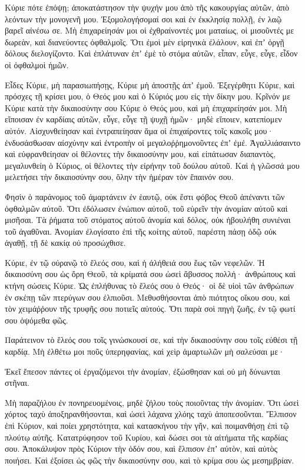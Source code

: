 \begin{spacing}{1.1}
\begin{multicols}{2}
Κύριε πότε ἐπόψῃ; ἀποκατάστησον τὴν ψυχήν μου ἀπὸ τῆς κακουργίας αὐτῶν, ἀπὸ λεόντων τὴν μονογενῆ μου.
Ἐξομολογήσομαί σοι καὶ ἐν ἐκκλησίᾳ πολλῇ, ἐν λαῷ βαρεῖ αἰνέσω σε.
Μὴ ἐπιχαρείησάν μοι οἱ ἐχθραίνοντές μοι ματαίως, οἱ μισοῦντές με δωρεὰν, καὶ διανεύοντες ὀφθαλμοῖς.
Ὅτι ἐμοὶ μὲν εἰρηνικὰ ἐλάλουν, καὶ ἐπʼ ὀργῇ δόλους διελογίζοντο.
Καὶ ἐπλάτυναν ἐπʼ ἐμὲ τὸ στόμα αὐτῶν, εἶπαν, εὖγε, εὖγε, εἶδον οἱ ὀφθαλμοὶ ἡμῶν.

Εἶδες Κύριε, μὴ παρασιωπήσῃς, Κύριε μὴ ἀποστῇς ἀπʼ ἐμοῦ.
Ἐξεγέρθητι Κύριε, καὶ πρόσχες τῇ κρίσει μου, ὁ Θεός μου καὶ ὁ Κύριός μου εἰς τὴν δίκην μου.
Κρῖνόν με Κύριε κατὰ τὴν δικαιοσύνην σου Κύριε ὁ Θεός μου, καὶ μὴ ἐπιχαρείησάν μοι.
Μὴ εἴποισαν ἐν καρδίαις αὐτῶν, εὖγε, εὖγε τῇ ψυχῇ ἡμῶν· μηδὲ εἴποιεν, κατεπίομεν αὐτόν.
Αἰσχυνθείησαν καὶ ἐντραπείησαν ἅμα οἱ ἐπιχαίροντες τοῖς κακοῖς μου· ἐνδυσάσθωσαν αἰσχύνην καὶ ἐντροπὴν οἱ μεγαλοῤῥημονοῦντες ἐπʼ ἐμέ.
Ἀγαλλιάσαιντο καὶ εὐφρανθείησαν οἱ θέλοντες τὴν δικαιοσύνην μου, καὶ εἰπάτωσαν διαπαντὸς, μεγαλυνθείη ὁ Κύριος, οἱ θέλοντες τὴν εἰρήνην τοῦ δούλου αὐτοῦ.
Καὶ ἡ γλῶσσά μου μελετήσει τὴν δικαιοσύνην σου, ὅλην τὴν ἡμέραν τὸν ἔπαινόν σου.

Φησὶν ὁ παράνομος τοῦ ἁμαρτάνειν ἐν ἑαυτῷ, οὐκ ἔστι φόβος Θεοῦ ἀπέναντι τῶν ὀφθαλμῶν αὐτοῦ.
Ὅτι ἐδόλωσεν ἐνώπιον αὐτοῦ, τοῦ εὑρεῖν τὴν ἀνομίαν αὐτοῦ καὶ μισῆσαι.
Τὰ ῥήματα τοῦ στόματος αὐτοῦ ἀνομία καὶ δόλος, οὐκ ἠβουλήθη συνιέναι τοῦ ἀγαθῦναι.
Ἀνομίαν ἐλογίσατο ἐπὶ τῆς κοίτης αὐτοῦ, παρέστη πάσῃ ὁδῷ οὐκ ἀγαθῇ, τῇ δὲ κακίᾳ οὐ προσώχθισε.

Κύριε, ἐν τῷ οὐρανῷ τὸ ἔλεός σου, καὶ ἡ ἀλήθειά σου ἕως τῶν νεφελῶν.
Ἡ δικαιοσύνη σου ὡς ὄρη Θεοῦ, τὰ κρίματά σου ὡσεὶ ἄβυσσος πολλή· ἀνθρώπους καὶ κτήνη σώσεις Κύριε.
Ὡς ἐπλήθυνας τὸ ἔλεός σου ὁ Θεός· οἱ δὲ υἱοὶ τῶν ἀνθρώπων ἐν σκέπῃ τῶν πτερύγων σου ἐλπιοῦσι.
Μεθυσθήσονται ἀπὸ πιότητος οἴκου σου, καὶ τὸν χειμάῤῥουν τῆς τρυφῆς σου ποτιεῖς αὐτούς.
Ὅτι παρὰ σοὶ πηγὴ ζωῆς, ἐν τῷ φωτί σου ὀψόμεθα φῶς.

Παράτεινον τὸ ἔλεός σου τοῖς γινώσκουσί σε, καὶ τὴν δικαιοσύνην σου τοῖς εὐθέσι τῇ καρδίᾳ.
Μὴ ἐλθέτω μοι ποῦς ὑπερηφανίας, καὶ χεὶρ ἁμαρτωλῶν μὴ σαλεύσαι με·

Ἐκεῖ ἔπεσον πάντες οἱ ἐργαζόμενοι τὴν ἀνομίαν, ἐξώσθησαν καὶ οὐ μὴ δύνωνται στῆναι.

Μὴ παραζήλου ἐν πονηρευομένοις, μηδὲ ζήλου τοὺς ποιοῦντας τὴν ἀνομίαν.
Ὅτι ὡσεὶ χόρτος ταχὺ ἀποξηρανθήσονται, καὶ ὡσεὶ λάχανα χλόης ταχὺ ἀποπεσοῦνται.
Ἔλπισον ἐπὶ Κύριον, καὶ ποίει χρηστότητα, καὶ κατασκήνου τὴν γῆν, καὶ ποιμανθήσῃ ἐπὶ τῷ πλούτῳ αὐτῆς.
Κατατρύφησον τοῦ Κυρίου, καὶ δώσει σοι τὰ αἰτήματα τῆς καρδίας σου.
Ἀποκάλυψον πρὸς Κύριον τὴν ὁδόν σου, καὶ ἔλπισον ἐπʼ αὐτὸν, καὶ αὐτὸς ποιήσει.
Καὶ ἐξοίσει ὡς φῶς τὴν δικαιοσύνην σου, καὶ τὸ κρίμα σου ὡς μεσημβρίαν.


\end{multicols}
\end{spacing}
